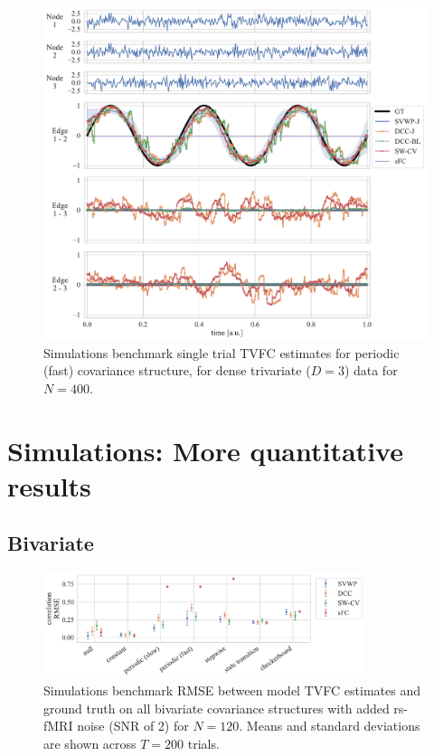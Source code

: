 \begin{figure}[ht]
  \centering
  \includegraphics[width=\textwidth]{fig/sim/d3s/N0400_T0003/no_noise/periodic_3_correlations}
  \caption{
    Simulations benchmark single trial TVFC estimates for periodic (fast) covariance structure, for dense trivariate ($D = 3$) data for $N = 400$.
  }\label{fig:results-d3s-no-noise-stepwise-covariance}
\end{figure}


\clearpage
\section{Simulations: More quantitative results}\label{appendix:sim-more-quantitative-results}

\subsection{Bivariate}


\begin{figure}[ht]
  \centering
  \includegraphics[width=0.84\textwidth]{fig/sim/d2/N0120_T0200/no_noise/correlation_RMSE}
  \caption{
    Simulations benchmark RMSE between model TVFC estimates and ground truth on all bivariate covariance structures with added rs-fMRI noise (SNR of 2) for $N = 120$.
    Means and standard deviations are shown across $T = 200$ trials.
  }\label{fig:results-sim-d2-120-no-noise-all-correlation-RMSE}
\end{figure}


